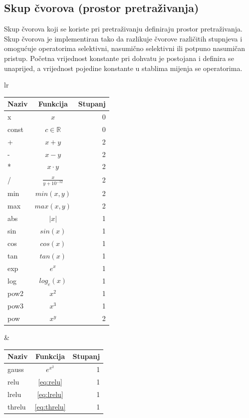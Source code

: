 \documentclass[times, utf8, numeric, diplomski]{fer}
\def\realnum{\mathbb{R}}
\begin{document}
\subsection{Skup čvorova (prostor pretraživanja)}
\label{sec:node_set}
Skup čvorova koji se koriste pri pretraživanju definiraju prostor pretraživanja. Skup čvorova je implementiran tako da razlikuje čvorove različitih stupnjeva i omogućuje operatorima selektivni, nasumično selektivni ili potpuno nasumičan pristup. Početna vrijednost konstante pri dohvatu je postojana i definira se unaprijed, a vrijednost pojedine konstante u stablima mijenja se operatorima.

\begin{table}[H]
\centering
\begin{tabular}[t]{lr}
\begin{tabular}[t]{l|c|r}
\textbf{Naziv} & \textbf{Funkcija} & \textbf{Stupanj} \\
\hline
x		& $x$					& 0 \\
const	& $c \in \realnum$		& 0 \\
\hline
+		& $x + y$				& 2 \\
-		& $x - y$				& 2 \\
*		& $x \cdot y$			& 2 \\
/		& $\frac{x}{y + 10^{-12}}$	& 2 \\
\hline
min		& $min(x, y)$			& 2 \\
max		& $max(x, y)$			& 2 \\
abs		& $|x|$					& 1 \\
\hline
sin		& $sin(x)$				& 1 \\
cos		& $cos(x)$				& 1 \\
tan		& $tan(x)$				& 1 \\
\hline
exp		& $e^x$					& 1 \\
log		& $log_e(x)$				& 1 \\
pow2		& $x^2$					& 1 \\
pow3		& $x^3$					& 1 \\
pow		& $x^y$					& 2 \\
\end{tabular}
& \quad
\begin{tabular}[t]{l|c|r}
\textbf{Naziv} & \textbf{Funkcija} & \textbf{Stupanj} \\
\hline
gauss	& $e^{x^2}$		& 1 \\
relu		& \eqref{eq:relu}		& 1 \\
lrelu	& \eqref{eq:lrelu}		& 1 \\
threlu 	& \eqref{eq:threlu}		& 1 \\

\end{tabular}
\end{tabular}
\end{table}
\end{document}
